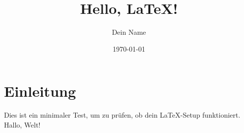 \documentclass{article}
\title{Hello, LaTeX!}
\author{Dein Name}
\date{\today}
\begin{document}
\maketitle

\section{Einleitung}
Dies ist ein minimaler Test, um zu prüfen, ob dein LaTeX-Setup funktioniert.
Hallo, Welt!
\end{document}
